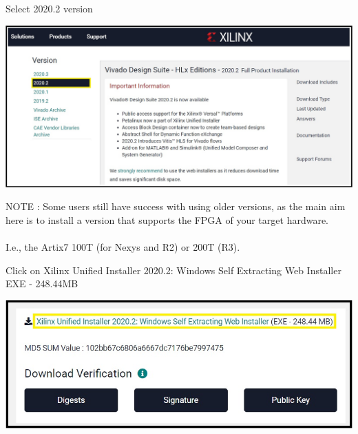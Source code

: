 \begin{minipage}{\linewidth}
  Select 2020.2 version
  \\
  \begin{center}
    \includegraphics[width=\linewidth]{images/VivadoInstimg002.jpg}
  \end{center}
  NOTE : Some users still have success with using older versions, as the main aim here is to install a version that supports the FPGA of your target hardware. \\
  \\
  I.e., the Artix7 100T (for Nexys and R2) or 200T (R3).
\end{minipage}

\begin{minipage}{\linewidth}
  Click on Xilinx Unified Installer 2020.2: Windows Self Extracting Web Installer EXE - 248.44MB
  \\
  \begin{center}
    \includegraphics[width=0.8\linewidth]{images/VivadoInstimg003.jpg}
  \end{center}
\end{minipage}

